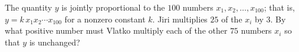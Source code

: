 The quantity $y$ is jointly proportional to the $100$ numbers $x_1,x_2,\dots,x_{100}$; that is, $y=k\,x_1x_2\cdots x_{100}$ for a nonzero constant $k$. Jiri multiplies $25$ of the $x_i$ by $3$. By what positive number must Vlatko multiply each of the other $75$ numbers $x_i$ so that $y$ is unchanged?
